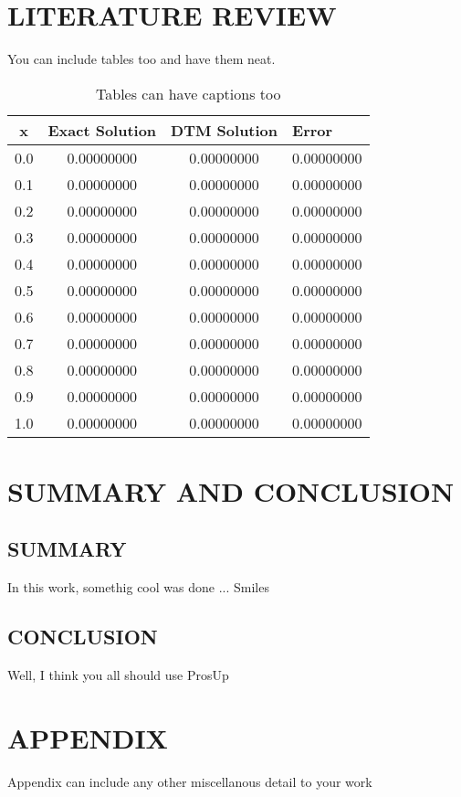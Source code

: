 \documentclass[12pt]{report}
\begin{document}
	\chapter{LITERATURE REVIEW}
	You can include tables too and have them neat.
	\begin{table}[H]
		\centering
		\begin{tabular}{cccl}
			\hline
			x   & Exact Solution & DTM Solution & Error \\ \hline
			0.0 & 0.00000000 & 0.00000000 & 0.00000000 \\
			0.1 & 0.00000000 & 0.00000000 & 0.00000000 \\
			0.2 & 0.00000000 & 0.00000000 & 0.00000000 \\
			0.3 & 0.00000000 & 0.00000000 & 0.00000000 \\
			0.4 & 0.00000000 & 0.00000000 & 0.00000000 \\
			0.5 & 0.00000000 & 0.00000000 & 0.00000000 \\
			0.6 & 0.00000000 & 0.00000000 & 0.00000000 \\
			0.7 & 0.00000000 & 0.00000000 & 0.00000000 \\
			0.8 & 0.00000000 & 0.00000000 & 0.00000000 \\
			0.9 & 0.00000000 & 0.00000000 & 0.00000000 \\
			1.0 & 0.00000000 & 0.00000000 & 0.00000000 \\ \hline
		\end{tabular}
		\caption{Tables can have captions too}
	\end{table}

	\chapter{SUMMARY AND CONCLUSION}
	\section{SUMMARY}
	In this work, somethig cool was done ... Smiles
	
	\section{CONCLUSION}
	Well, I think you all should use ProsUp
	
	
	

	\chapter*{APPENDIX}
	Appendix can include any other miscellanous detail to your work
\end{document}
